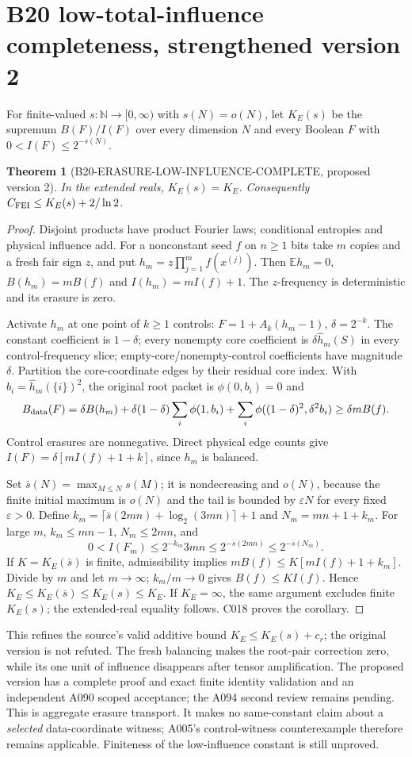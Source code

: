 \documentclass[11pt]{article}
\newtheorem{theorem}[lemma]{Theorem}
\newcommand{\E}{\mathbb E}
\begin{document}
\section{B20 low-total-influence completeness, strengthened version 2}
\label{sec:low}
For finite-valued $s:\mathbb N\to[0,\infty)$ with $s(N)=o(N)$,
let $K_E(s)$ be the supremum $B(F)/I(F)$ over every dimension
$N$ and every Boolean $F$ with $0<I(F)\le2^{-s(N)}$.
\begin{theorem}[B20-ERASURE-LOW-INFLUENCE-COMPLETE, proposed version 2]
\label{thm:low}
In the extended reals, $K_E(s)=K_E$. Consequently
$C_{\rm FEI}\le K_E(s)+2/\ln2$.
\end{theorem}
\begin{proof}
Disjoint products have product Fourier laws; conditional entropies
and physical influence add. For a nonconstant seed $f$ on $n\ge1$
bits take $m$ copies and a fresh fair sign $z$, and put
$h_m=z\prod_{j=1}^m f(x^{(j)})$.
Then $\E h_m=0$, $B(h_m)=mB(f)$ and $I(h_m)=mI(f)+1$.
The $z$-frequency is deterministic and its erasure is zero.

Activate $h_m$ at one point of $k\ge1$ controls: $F=1+A_k(h_m-1)$,
$\delta=2^{-k}$. The constant coefficient is $1-\delta$;
every nonempty core coefficient is $\delta\widehat h_m(S)$
in every control-frequency slice; empty-core/nonempty-control
coefficients have magnitude $\delta$. Partition the core-coordinate
edges by their residual core index. With $b_i=\widehat h_m(\{i\})^2$,
the original root packet is $\phi(0,b_i)=0$ and
\[
B_{\rm data}(F)=\delta B(h_m)
 +\delta(1-\delta)\sum_i\phi(1,b_i)
 +\sum_i\phi((1-\delta)^2,\delta^2b_i)\ge\delta mB(f).
\]
Control erasures are nonnegative. Direct physical edge counts give
$I(F)=\delta[mI(f)+1+k]$, since $h_m$ is balanced.

Set $\bar s(N)=\max_{M\le N}s(M)$; it is nondecreasing and
$o(N)$, because the finite initial maximum is $o(N)$ and the
tail is bounded by $\varepsilon N$ for every fixed $\varepsilon>0$.
Define $k_m=\lceil\bar s(2mn)+\log_2(3mn)\rceil+1$ and
$N_m=mn+1+k_m$. For large $m$, $k_m\le mn-1$, $N_m\le2mn$, and
\[
0<I(F_m)\le2^{-k_m}3mn
\le2^{-\bar s(2mn)}\le2^{-\bar s(N_m)}.
\]
If $K=K_E(\bar s)$ is finite, admissibility implies
$mB(f)\le K[mI(f)+1+k_m]$.
Divide by $m$ and let $m\to\infty$; $k_m/m\to0$ gives
$B(f)\le KI(f)$. Hence
$K_E\le K_E(\bar s)\le K_E(s)\le K_E$.
If $K_E=\infty$, the same argument excludes finite $K_E(s)$;
the extended-real equality follows. C018 proves the corollary.
\end{proof}
This refines the source's valid additive bound
$K_E\le K_E(s)+c_r$; the original version is not refuted.
The fresh balancing makes the root-pair correction zero, while its
one unit of influence disappears after tensor amplification.
The proposed version has a complete proof and exact finite identity
validation and an independent A090 scoped acceptance; the A094 second
review remains pending.
This is aggregate erasure transport. It makes no same-constant
claim about a \emph{selected} data-coordinate witness; A005's
control-witness counterexample therefore remains applicable.
Finiteness of the low-influence constant is still unproved.
\end{document}
